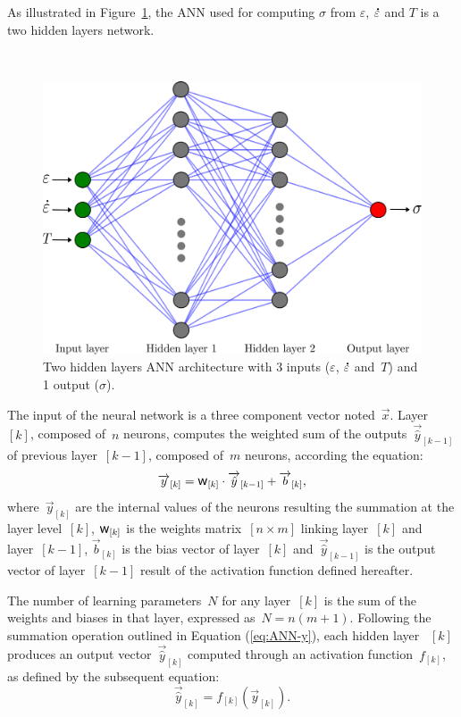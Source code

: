 \documentclass[algorithms,article,accept,pdftex,oneauthor]{Definitions/mdpi}
\DeclareRobustCommand{\w}{\mbox{\large\ensuremath{\mathsf{w}}}}
\DeclareRobustCommand{\lay}[1]{_{[#1]}}
\DeclareRobustCommand{\Lay}[1]{\mbox{$[#1]$}}
\DeclareRobustCommand{\mdot}[1]{\accentset{\mbox{\bfseries .}}{#1}}
\begin{document}
As illustrated in Figure~\ref{fig:ANN-2HL}, the ANN used for computing $\sigma$ from $\varepsilon$, $\mdot{\varepsilon}$ and $T$ is a two hidden layers network.
\begin{figure}[H]
\

\includegraphics[width=0.55\columnwidth]{Figures/ANN-2HL}
\caption{Two %
 hidden layers ANN architecture with 3 inputs ($\varepsilon$, $\mdot{\varepsilon}$ and~$T$) and 1 output ($\sigma$).}
\label{fig:ANN-2HL}
\end{figure}
The input of the neural network is a three component vector noted~$\overrightarrow{x}$.
Layer~\Lay{k}, composed of~$n$ neurons, computes the weighted sum of the outputs~$\overrightarrow{\hat{y}}\lay{k-1}$ of previous layer~\Lay{k-1}, composed of~$m$ neurons, according the equation:
\begin{equation}
\overrightarrow{y}\lay{k} = \w\lay{k} \cdot \overrightarrow{\hat{y}}\lay{k-1}+ \overrightarrow{b}\lay{k}\label{eq:ANN-y},
\end{equation}
where~$\overrightarrow{y}\lay{k}$ are the internal values of the neurons resulting the summation at the layer level~\Lay{k}, $\w\lay{k}$ is the weights matrix~$[n\times m]$ linking layer~\Lay{k} and layer~\Lay{k-1}, $\overrightarrow{b}\lay{k}$ is the bias vector of layer~\Lay{k} and~$\overrightarrow{\hat{y}}\lay{k-1}$ is the output vector of layer~\Lay{k-1} result of the activation function defined hereafter.

The number of learning parameters~$N$ for any layer~\Lay{k} is the sum of the weights and biases in that layer, expressed as~$N=n(m+1)$.
Following the summation operation outlined in Equation (\ref{eq:ANN-y}), each hidden layer ~\Lay{k} produces an output vector~$\overrightarrow{\hat{y}}\lay{k}$ computed through an activation function~$f\lay{k}$, as defined by the subsequent equation:
\begin{equation}
\overrightarrow{\hat{y}}\lay{k}=f\lay{k}(\overrightarrow{y}\lay{k}).
\label{eq:ANN-f}
\end{equation}
\end{document}
